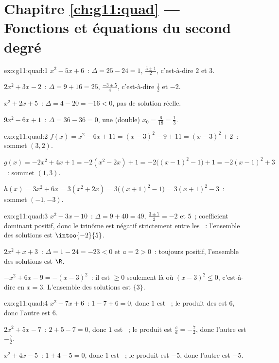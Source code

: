 \section*{Chapitre \ref{ch:g11:quad} --- Fonctions et équations du second degré}

\begin{solution}{exo:g11:quad:1}
$x^2-5x+6$~: $\Delta = 25 - 24 = 1$,  $\frac{5 \pm 1}{2}$,
c'est-à-dire $2$ et $3$.

$2x^2+3x-2$~: $\Delta = 9 + 16 = 25$,  $\frac{-3 \pm 5}{4}$,
c'est-à-dire $\frac12$ et $-2$.

$x^2+2x+5$~: $\Delta = 4 - 20 = -16 < 0$, pas de solution réelle.

$9x^2-6x+1$~: $\Delta = 36 - 36 = 0$, une (double) 
$x_0 = \frac{6}{18} = \frac13$.
\end{solution}

\begin{solution}{exo:g11:quad:2}
$f(x) = x^2 - 6x + 11 = (x-3)^2 - 9 + 11 = (x-3)^2 + 2$~: sommet
$(3, 2)$.

$g(x) = -2x^2+4x+1 = -2(x^2 - 2x) + 1 = -2\bigl((x-1)^2 - 1\bigr) + 1
= -2(x-1)^2 + 3$~: sommet $(1, 3)$.

$h(x) = 3x^2 + 6x = 3(x^2 + 2x) = 3\bigl((x+1)^2 - 1\bigr)
= 3(x+1)^2 - 3$~: sommet $(-1, -3)$.
\end{solution}

\begin{solution}{exo:g11:quad:3}
$x^2 - 3x - 10$~: $\Delta = 9 + 40 = 49$, 
$\frac{3 \pm 7}{2} = -2$ et $5$~; coefficient dominant positif, donc le
trinôme est négatif strictement entre les ~: l'ensemble des
solutions est $\intoo{-2}{5}$.

$2x^2 + x + 3$~: $\Delta = 1 - 24 = -23 < 0$ et $a = 2 > 0$~: toujours
positif, l'ensemble des solutions est $\R$.

$-x^2 + 6x - 9 = -(x-3)^2$~: il est $\geq 0$ seulement là où
$(x-3)^2 \leq 0$, c'est-à-dire en $x = 3$. L'ensemble des solutions est
$\{3\}$.
\end{solution}

\begin{solution}{exo:g11:quad:4}
$x^2 - 7x + 6$~: $1 - 7 + 6 = 0$, donc $1$ est ~; le produit des
 est $6$, donc l'autre  est $6$.

$2x^2 + 5x - 7$~: $2 + 5 - 7 = 0$, donc $1$ est ~; le produit est
$\frac{c}{a} = -\frac72$, donc l'autre  est $-\frac72$.

$x^2 + 4x - 5$~: $1 + 4 - 5 = 0$, donc $1$ est ~; le produit est
$-5$, donc l'autre  est $-5$.
\end{solution}

